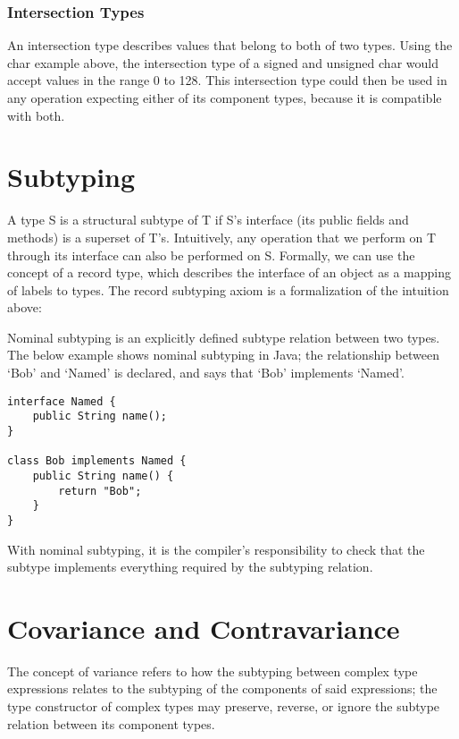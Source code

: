 \subsubsection{Intersection Types}

An intersection type describes values that belong to both of two types. Using the char example above, the intersection type of a signed and unsigned char would accept values in the range 0 to 128. This intersection type could then be used in any operation expecting either of its component types, because it is compatible with both.

\section{Subtyping}

A type S is a structural subtype of T if S’s interface (its public fields and methods) is a superset of T’s. Intuitively, any operation that we perform on T through its interface can also be performed on S.
Formally, we can use the concept of a record type, which describes the interface of an object as a mapping of labels to types. The record subtyping axiom is a formalization of the intuition above:

\begin{mathpar}
\end{mathpar}

Nominal subtyping is an explicitly defined subtype relation between two types. The below example shows nominal subtyping in Java; the relationship between ‘Bob’ and ‘Named’ is declared, and says that ‘Bob’ implements ‘Named’.
\begin{verbatim}
interface Named {
    public String name();
}

class Bob implements Named {
    public String name() {
        return "Bob";
    }
}
\end{verbatim}
With nominal subtyping, it is the compiler’s responsibility to check that the subtype implements everything required by the subtyping relation.

\section{Covariance and Contravariance}

The concept of variance refers to how the subtyping between complex type expressions relates to the subtyping of the components of said expressions; the type constructor of complex types may preserve, reverse, or ignore the subtype relation between its component types.

